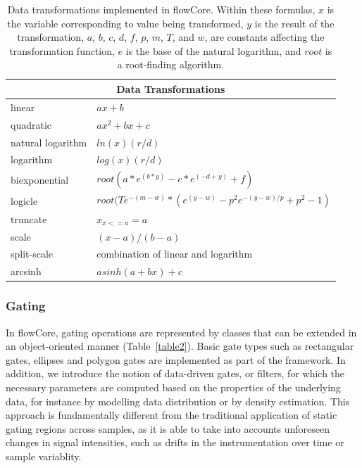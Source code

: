 \documentclass[12pt]{article}
\newcommand{\Rpackage}[1]{{\textsf{#1}}}
\begin{document}
\begin{table}[ht]
\begin{center}
\begin{tabular}{|l|l|}
\hline
\multicolumn{2}{|c|}{Data Transformations} \\
\hline
linear & $ax + b$ \\
quadratic & $ax^2 + bx + c$ \\
natural logarithm & $ln(x)(r/d)$ \\
logarithm & $log(x)(r/d)$ \\
biexponential & $root(a*e^{(b*y)}-c*e^{(-d+y)}+f)$ \\
logicle& $root(Te^{-(m-w)}*(e^{(y-w)}-p^2e^{-(y-w)/p}+p^2-1)$ \\
truncate & $x_{x<=a} = a$ \\
scale & $(x-a)/(b-a)$ \\
split-scale & combination of linear and logarithm \\
arcsinh & $asinh(a + bx)+c$ \\
\hline
\end{tabular}
\caption{\label{table1}Data transformations implemented in
  \Rpackage{flowCore}. Within these formulas, $x$ is the variable
  corresponding to value being transformed, $y$ is the result of the
  transformation, $a$, $b$, $c$, $d$, $f$, $p$, $m$, $T$, and $w$, are
  constants affecting the transformation function, $e$ is the base of
  the natural logarithm, and $root$ is a root-finding algorithm.  }
\end{center}
\end{table}

\subsubsection*{Gating}
In \Rpackage{flowCore}, gating operations are represented by classes
that can be extended in an object-oriented manner
(Table~\ref{table2}). Basic gate types such as rectangular gates,
ellipses and polygon gates are implemented as part of the
framework. In addition, we introduce the notion of data-driven gates,
or filters, for which the necessary parameters are computed based on
the properties of the underlying data, for instance by modelling data
distribution or by density estimation. This approach is fundamentally
different from the traditional application of static gating regions
across samples, as it is able to take into accounts unforeseen changes
in signal intensities, such as drifts in the instrumentation
over time or sample variablity.
\end{document}
